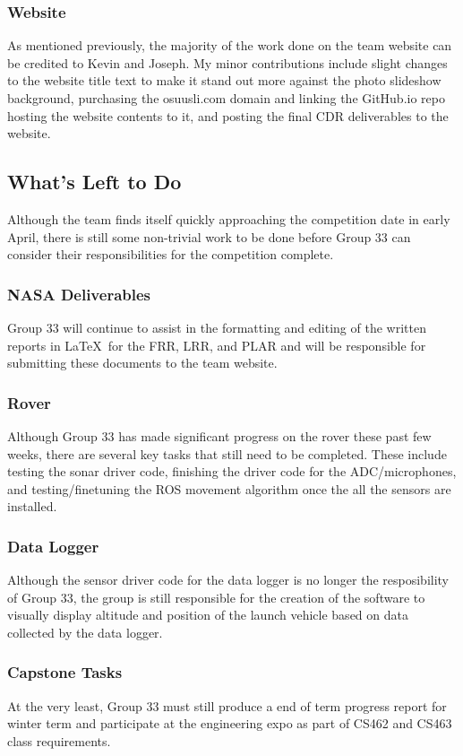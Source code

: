\documentclass[onecolumn, draftclsnofoot,10pt, compsoc]{IEEEtran}
\begin{document}
\subsubsection{Website}
As mentioned previously, the majority of the work done on the team website can be credited to Kevin and Joseph. My minor contributions include slight changes to the website title text to make it stand out more against the photo slideshow background, purchasing the osuusli.com domain and linking the GitHub.io repo hosting the website contents to it, and posting the final CDR deliverables to the website. 

\subsection{What's Left to Do}
Although the team finds itself quickly approaching the competition date in early April, there is still some non-trivial work to be done before Group 33 can consider their responsibilities for the competition complete.

\subsubsection{NASA Deliverables}
Group 33 will continue to assist in the formatting and editing of the written reports in \LaTeX~for the FRR, LRR, and PLAR and will be responsible for submitting these documents to the team website.

\subsubsection{Rover}
Although Group 33 has made significant progress on the rover these past few weeks, there are several key tasks that still need to be completed. These include testing the sonar driver code, finishing the driver code for the ADC/microphones, and testing/finetuning the ROS movement algorithm once the all the sensors are installed.

\subsubsection{Data Logger}
Although the sensor driver code for the data logger is no longer the resposibility of Group 33, the group is still responsible for the creation of the software to visually display altitude and position of the launch vehicle based on data collected by the data logger.

\subsubsection{Capstone Tasks}
At the very least, Group 33 must still produce a end of term progress report for winter term and participate at the engineering expo as part of CS462 and CS463 class requirements.
\end{document}
